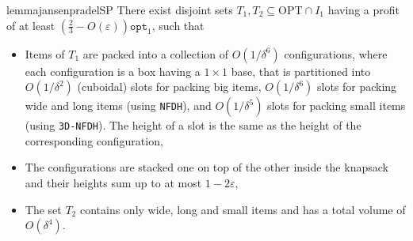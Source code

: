 \documentclass[10pt,a4paper]{amsart}
\renewcommand{\epsilon}{\varepsilon} %
\newcommand{\NFDH}{\texttt{NFDH}\xspace}
\newcommand{\tNFDH}{\texttt{3D-NFDH}\xspace}
\theoremstyle{definition}
\newcommand{\opt}{\mathtt{opt}}
\begin{document}
\begin{restatable}{lemma}{jansenpradelSP}
\label{lem:jansenpradelSP}
    There exist disjoint sets $T_1,T_2\subseteq \text{OPT}\cap I_1$ having a profit of at least $\left(\frac{2}{3}-O(\epsilon)\right)\opt_1$, such that
    \begin{itemize}
        \item Items of $T_1$ are packed into a collection of $O(1/\delta^6)$ configurations, where each configuration is a box having a $1\times 1$ base, that is partitioned 
    into  $O(1/\delta^2)$ (cuboidal) slots for packing big items, $O(1/\delta^6)$ slots for packing wide and long items (using \NFDH), and $O(1/\delta^5)$ slots for packing small items (using \tNFDH). The height of a slot is the same as the height of the corresponding configuration,
        \item The configurations are stacked one on top of the other inside the knapsack and their heights sum up to at most $1-2\epsilon$,
        \item The set $T_2$ contains only wide, long and small items and has a total volume of $O(\delta^4)$. %
    \end{itemize}
\end{restatable}
\end{document}
